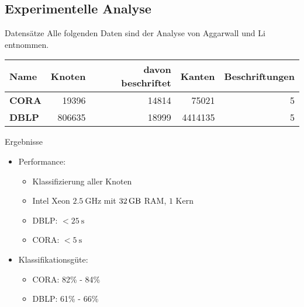 \subsection{Experimentelle Analyse}
\begin{frame}{Datensätze}
    Alle folgenden Daten sind der Analyse von Aggarwall und Li
    entnommen.

    \begin{table}
        \begin{tabular}{|l||r|r|r|r|}\hline
        \textbf{Name} & \textbf{Knoten} & \textbf{davon beschriftet} & \textbf{Kanten}  & \textbf{Beschriftungen} \\ \hline\hline
        \textbf{CORA} & \num{19396}  & \num{14814}             & \num{75021}   & 5              \\
        \textbf{DBLP} & \num{806635} & \num{18999 }            & \num{4414135} & 5              \\\hline
        \end{tabular}
    \end{table}
\end{frame}

\begin{frame}{Ergebnisse}
    \begin{itemize}
        \item<1-> Performance:
            \begin{itemize}
                \item<2-> Klassifizierung aller Knoten
                \item<3-> Intel Xeon $\SI{2.5}{\GHz}$ mit $\SI{32}{\giga\byte}$ RAM, $1$ Kern
                \item<4-> DBLP: $< \SI{25}{\second}$
                \item<5-> CORA: $< \SI{5}{\second}$
            \end{itemize}
        \item<6-> Klassifikationsgüte:
            \begin{itemize}
                \item<7-> CORA: 82\% - 84\%
                \item<8-> DBLP: 61\% - 66\%
            \end{itemize}
    \end{itemize}
\end{frame}
